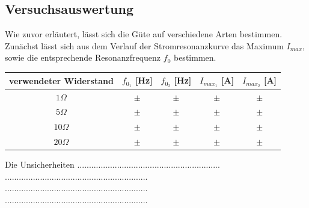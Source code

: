 \documentclass[a4paper, 11pt]{article}
\begin{document}
\subsection{Versuchsauswertung}
Wie zuvor erläutert, lässt sich die Güte auf verschiedene Arten bestimmen. \\
Zunächst lässt sich aus dem Verlauf der Stromresonanzkurve das Maximum $I_{max}$, sowie die entsprechende Resonanzfrequenz $f_0$ bestimmen.
\begin{center}
\renewcommand{\arraystretch}{1.5}
\begin{tabular}{|c|c|c|c|c|}
\hline verwendeter Widerstand	& $f_{0_1}$	[Hz]&	$f_{0_2}$	[Hz] & $I_{max_1}$ [A]& $I_{max_2}$ [A]\\
\hline $  1 \Omega $		&	$ \pm $	&	$ \pm $	&	$ \pm $	&	$ \pm $ 	\\
\hline $  5 \Omega $		&	$ \pm $	&	$ \pm $	&	$ \pm $	&	$ \pm $ 	\\
\hline $ 10 \Omega $		&	$ \pm $	&	$ \pm $	&	$ \pm $	&	$ \pm $		\\
\hline $ 20 \Omega $		&	$ \pm $	&	$ \pm $	&	$ \pm $	&	$ \pm $		\\
\hline
\end{tabular}
\end{center}
Die Unsicherheiten 
.............................................................\\
.............................................................\\
.............................................................\\
.............................................................\\
\end{document}
